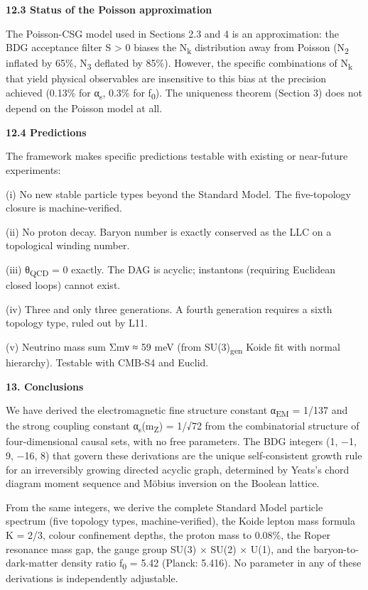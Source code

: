 \documentclass[12pt,a4paper]{article}
\begin{document}
\textbf{12.3 Status of the Poisson approximation}

The Poisson-CSG model used in Sections 2.3 and 4 is an approximation:
the BDG acceptance filter S \textgreater{} 0 biases the
N\textsubscript{k} distribution away from Poisson (N\textsubscript{2}
inflated by 65\%, N\textsubscript{3} deflated by 85\%). However, the
specific combinations of N\textsubscript{k} that yield physical
observables are insensitive to this bias at the precision achieved
(0.13\% for α\textsubscript{s}, 0.3\% for f\textsubscript{0}). The
uniqueness theorem (Section 3) does not depend on the Poisson model at
all.

\textbf{12.4 Predictions}

The framework makes specific predictions testable with existing or
near-future experiments:

(i) No new stable particle types beyond the Standard Model. The
five-topology closure is machine-verified.

(ii) No proton decay. Baryon number is exactly conserved as the LLC on a
topological winding number.

(iii) θ\textsubscript{QCD} = 0 exactly. The DAG is acyclic; instantons
(requiring Euclidean closed loops) cannot exist.

(iv) Three and only three generations. A fourth generation requires a
sixth topology type, ruled out by L11.

(v) Neutrino mass sum Σmν ≈ 59 meV (from SU(3)\textsubscript{gen} Koide
fit with normal hierarchy). Testable with CMB-S4 and Euclid.

\textbf{13. Conclusions}

We have derived the electromagnetic fine structure constant
α\textsubscript{EM} = 1/137 and the strong coupling constant
α\textsubscript{s}(m\textsubscript{Z}) = 1/√72 from the combinatorial
structure of four-dimensional causal sets, with no free parameters. The
BDG integers (1, −1, 9, −16, 8) that govern these derivations are the
unique self-consistent growth rule for an irreversibly growing directed
acyclic graph, determined by Yeats's chord diagram moment sequence and
Möbius inversion on the Boolean lattice.

From the same integers, we derive the complete Standard Model particle
spectrum (five topology types, machine-verified), the Koide lepton mass
formula K = 2/3, colour confinement depths, the proton mass to 0.08\%,
the Roper resonance mass gap, the gauge group SU(3) × SU(2) × U(1), and
the baryon-to-dark-matter density ratio f\textsubscript{0} = 5.42
(Planck: 5.416). No parameter in any of these derivations is
independently adjustable.
\end{document}
